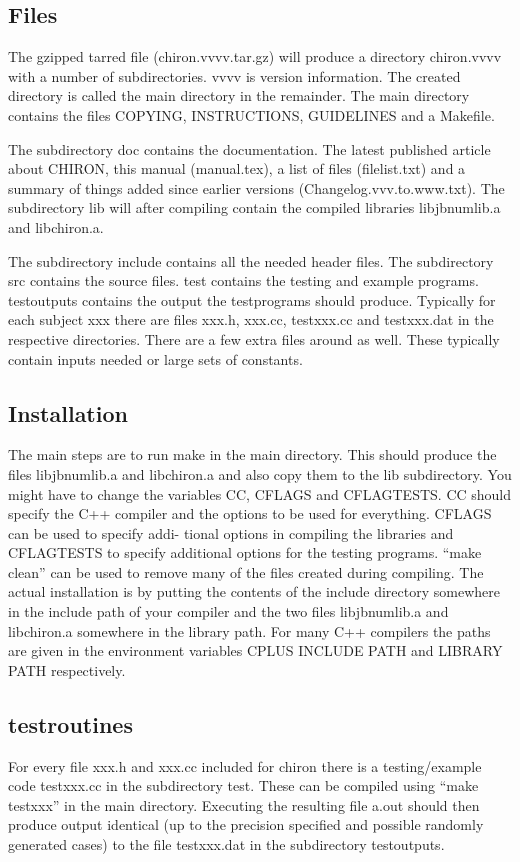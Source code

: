 \documentclass[a4paper,12pt]{article}
\begin{document}
\subsection*{Files}
The gzipped tarred file (chiron.vvvv.tar.gz) will produce a directory chiron.vvvv with
a number of subdirectories. vvvv is version information. The created directory is called
the main directory in the remainder.
The main directory contains the files COPYING, INSTRUCTIONS, GUIDELINES and a Makefile.

The subdirectory doc contains the documentation. The latest published article about
CHIRON, this manual (manual.tex), a list of files (filelist.txt) and a summary of
things added since earlier versions (Changelog.vvv.to.www.txt).
The subdirectory lib will after compiling contain the compiled libraries libjbnumlib.a
and libchiron.a.

The subdirectory include contains all the needed header files. The subdirectory src
contains the source files. test contains the testing and example programs. testoutputs
contains the output the testprograms should produce.
Typically for each subject xxx there are files xxx.h, xxx.cc, testxxx.cc and testxxx.dat
in the respective directories.
There are a few extra files around as well. These typically contain inputs needed or large
sets of constants.


\subsection*{Installation}

The main steps are to run make in the main directory. This should produce the files
libjbnumlib.a and libchiron.a and also copy them to the lib subdirectory. You might
have to change the variables CC, CFLAGS and CFLAGTESTS. CC should specify the C++
compiler and the options to be used for everything. CFLAGS can be used to specify addi-
tional options in compiling the libraries and CFLAGTESTS to specify additional options for
the testing programs.
“make clean” can be used to remove many of the files created during compiling.
The actual installation is by putting the contents of the include directory somewhere
in the include path of your compiler and the two files libjbnumlib.a and libchiron.a
somewhere in the library path. For many C++ compilers the paths are given in the
environment variables CPLUS INCLUDE PATH and LIBRARY PATH respectively.
\subsection*{testroutines}

For every file xxx.h and xxx.cc included for chiron there is a testing/example code
testxxx.cc in the subdirectory test. These can be compiled using “make testxxx” in the
main directory. Executing the resulting file a.out should then produce output identical (up
to the precision specified and possible randomly generated cases) to the file testxxx.dat
in the subdirectory testoutputs.
  
\end{document}
